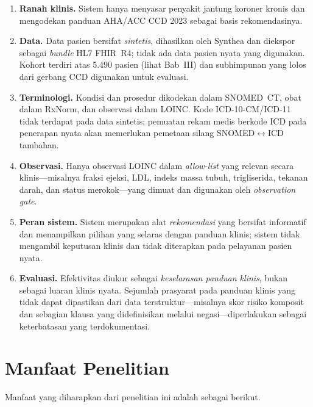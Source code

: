 \begin{enumerate}
    \item \textbf{Ranah klinis.} Sistem hanya menyasar penyakit jantung koroner kronis
    dan mengodekan panduan AHA/ACC CCD 2023 \cite{virani2023} sebagai basis rekomendasinya.
    \item \textbf{Data.} Data pasien bersifat \emph{sintetis}, dihasilkan oleh Synthea
    dan diekspor sebagai \emph{bundle} HL7 FHIR~R4; tidak ada data pasien nyata yang
    digunakan. Kohort terdiri atas 5.490 pasien (lihat Bab~III) dan subhimpunan
    yang lolos dari gerbang CCD digunakan untuk evaluasi.
    \item \textbf{Terminologi.} Kondisi dan prosedur dikodekan dalam SNOMED~CT, obat dalam
    RxNorm, dan observasi dalam LOINC. Kode ICD-10-CM/ICD-11 tidak terdapat pada data
    sintetis; pemuatan rekam medis berkode ICD pada penerapan nyata akan memerlukan
    pemetaan silang SNOMED$\leftrightarrow$ICD tambahan.
    \item \textbf{Observasi.} Hanya observasi LOINC dalam \emph{allow-list} yang
    relevan secara klinis---misalnya fraksi ejeksi, LDL, indeks massa tubuh, trigliserida,
    tekanan darah, dan status merokok---yang dimuat dan digunakan oleh \emph{observation gate}.
    \item \textbf{Peran sistem.} Sistem merupakan alat \emph{rekomendasi} yang
    bersifat informatif dan menampilkan pilihan yang selaras dengan panduan klinis; sistem tidak
    mengambil keputusan klinis dan tidak diterapkan pada pelayanan pasien nyata.
    \item \textbf{Evaluasi.} Efektivitas diukur sebagai \emph{keselarasan panduan klinis}, bukan
    sebagai luaran klinis nyata. Sejumlah prasyarat pada panduan klinis yang tidak dapat dipastikan
    dari data terstruktur---misalnya skor risiko komposit dan sebagian klausa yang
    didefinisikan melalui negasi---diperlakukan sebagai keterbatasan yang terdokumentasi.
\end{enumerate}

\section{Manfaat Penelitian}

Manfaat yang diharapkan dari penelitian ini adalah sebagai berikut.

